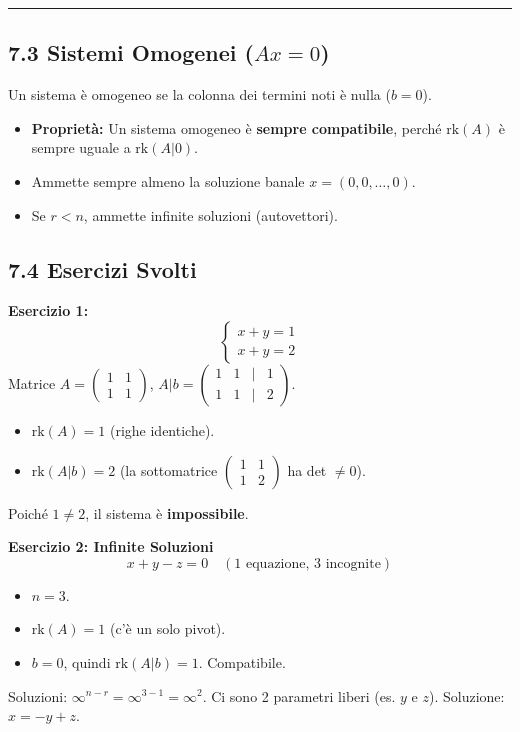 \documentclass[10pt,a4paper]{article}
\begin{document}
\vspace{0.4cm}
\hrule
\vspace{0.4cm}

\subsection*{7.3 Sistemi Omogenei ($Ax = 0$)}
Un sistema è omogeneo se la colonna dei termini noti è nulla ($b=0$).
\begin{itemize}
    \item \textbf{Proprietà:} Un sistema omogeneo è \textbf{sempre compatibile}, perché $\text{rk}(A)$ è sempre uguale a $\text{rk}(A|0)$.
    \item Ammette sempre almeno la soluzione banale $x = (0,0,\dots,0)$.
    \item Se $r < n$, ammette infinite soluzioni (autovettori).
\end{itemize}

\subsection*{7.4 Esercizi Svolti}

\textbf{Esercizio 1:}
\[ \begin{cases} x + y = 1 \\ x + y = 2 \end{cases} \]
Matrice $A = \begin{pmatrix} 1 & 1 \\ 1 & 1 \end{pmatrix}$, $A|b = \begin{pmatrix} 1 & 1 & | & 1 \\ 1 & 1 & | & 2 \end{pmatrix}$.
\begin{itemize}
    \item $\text{rk}(A) = 1$ (righe identiche).
    \item $\text{rk}(A|b) = 2$ (la sottomatrice $\begin{pmatrix} 1 & 1 \\ 1 & 2 \end{pmatrix}$ ha det $\neq 0$).
\end{itemize}
Poiché $1 \neq 2$, il sistema è \textbf{impossibile}.

\vspace{0.3cm}

\textbf{Esercizio 2: Infinite Soluzioni}
\[ x + y - z = 0 \quad (\text{1 equazione, 3 incognite}) \]
\begin{itemize}
    \item $n = 3$.
    \item $\text{rk}(A) = 1$ (c'è un solo pivot).
    \item $b=0$, quindi $\text{rk}(A|b)=1$. Compatibile.
\end{itemize}
Soluzioni: $\infty^{n-r} = \infty^{3-1} = \infty^2$.
Ci sono 2 parametri liberi (es. $y$ e $z$). Soluzione: $x = -y + z$.
\end{document}
